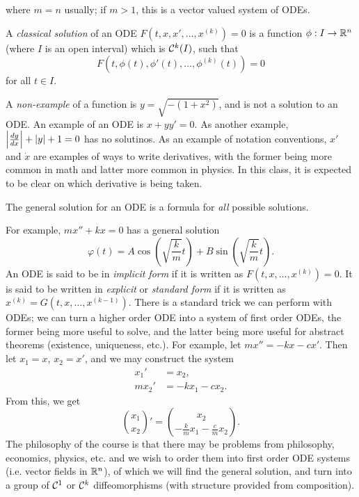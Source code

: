 where $m = n$ usually; if $m > 1$, this is a vector valued system of ODEs.
\begin{definition}
    A \textit{classical solution} of an ODE $F(t, x, x', \dots, x^{(k)}) = 0$ is a function $\phi : I \to \mathbb R^n$ (where $I$ is an open interval) which is $\mathcal C^k(I)$, such that
    \[ F(t, \phi(t), \phi'(t), \dots, \phi^{(k)}(t)) = 0 \]
    for all $t \in I$.
\end{definition}
\noindent A \textit{non-example} of a function is $y = \sqrt{-(1 + x^2)}$, and is not a solution to an ODE. An example of an ODE is $x + y y' = 0$. As another example, $\left\lvert \frac{dy}{dx} \right\rvert + \left\lvert y \right\rvert + 1 = 0$ has no solutinos.
\medskip\newline
As an example of notation conventions, $x'$ and $\dot x$ are examples of ways to write derivatives, with the former being more common in math and latter more common in physics. In this class, it is expected to be clear on which derivative is being taken.
\begin{definition}
    The general solution for an ODE is a formula for \textit{all} possible solutions.
\end{definition}
\noindent For example, $mx'' + kx = 0$ has a general solution
\[ \varphi(t) = A \cos \left(\sqrt{\frac{k}{m}} t\right) + B \sin \left(\sqrt{\frac{k}{m}} t\right). \]
An ODE is said to be in \textit{implicit form} if it is written as $F(t, x, \dots, x^{(k)}) = 0$. It is said to be written in \textit{explicit} or \textit{standard form} if it is written as $x^{(k)} = G(t, x, \dots, x^{(k-1)})$.
\medskip\newline
There is a standard trick we can perform with ODEs; we can turn a higher order ODE into a system of first order ODEs, the former being more useful to solve, and the latter being more useful for abstract theorems (existence, uniqueness, etc.). For example, let $m x'' = -kx  - cx'$. Then let $x_1 = x$, $x_2 = x'$, and we may construct the system
\begin{align*}
    x_1' &= x_2, \\
    mx_2' &= -k x_1 - cx_2.
\end{align*}
From this, we get
\[ \binom{x_1}{x_2}' = \binom{x_2}{-\frac{k}{m}x_1 - \frac{c}{m}x_2}. \]
The philosophy of the course is that there may be problems from philosophy, economics, physics, etc. and we wish to order them into first order ODE systems (i.e. vector fields in $\mathbb R^n$), of which we will find the general solution, and turn into a group of $\mathcal C^1$ or $\mathcal C^k$ diffeomorphisms (with structure provided from composition).
